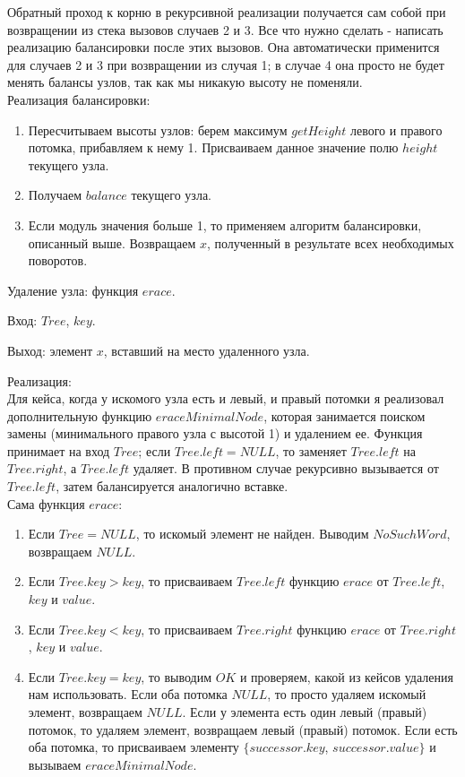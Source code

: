\documentclass[12pt]{article}
\begin{document}
	Обратный проход к корню в рекурсивной реализации получается сам собой при возвращении из стека вызовов случаев 2 и 3. Все что нужно сделать - написать реализацию балансировки после этих вызовов. Она автоматически применится для случаев 2 и 3 при возвращении из случая 1; в случае 4 она просто не будет менять балансы узлов, так как мы никакую высоту не поменяли. \\[1mm]
	
	Реализация балансировки: 
	
	\begin{enumerate}
		\item Пересчитываем высоты узлов: берем максимум $getHeight$ левого и правого потомка, прибавляем к нему 1. Присваиваем данное значение полю $height$ текущего узла.
		\item Получаем $balance$ текущего узла.
		\item Если модуль значения больше 1, то применяем алгоритм балансировки, описанный выше. Возвращаем $x$, полученный в результате всех необходимых поворотов.
	\end{enumerate} 

	Удаление узла: функция $erace$.
	
	Вход: $Tree$, $key$.
	
	Выход: элемент $x$, вставший на место удаленного узла.
	
	Реализация: \\[1mm]
	
	Для кейса, когда у искомого узла есть и левый, и правый потомки я реализовал дополнительную функцию $eraceMinimalNode$, которая занимается поиском замены (минимального правого узла с высотой 1) и удалением ее. Функция принимает на вход $Tree$; если $Tree.left = NULL$, то заменяет $Tree.left$ на $Tree.right$, а $Tree.left$ удаляет. В противном случае рекурсивно вызывается от $Tree.left$, затем балансируется аналогично вставке. \\[1mm]
	
	Сама функция $erace$:
	
	\begin{enumerate}
		\item Если $Tree = NULL$, то искомый элемент не найден. Выводим $NoSuchWord$, возвращаем $NULL$.
		\item Если $Tree.key > key$, то присваиваем $Tree.left$ функцию $erace$ от $Tree.left$, $key$ и $value$.
		\item Если $Tree.key < key$, то присваиваем $Tree.right$ функцию $erace$ от $Tree.right$, $key$ и $value$.
		\item Если $Tree.key = key$, то выводим $OK$ и проверяем, какой из кейсов удаления нам использовать. Если оба потомка $NULL$, то просто удаляем искомый элемент, возвращаем $NULL$. Если у элемента есть один левый (правый) потомок, то удаляем элемент, возвращаем левый (правый) потомок. Если есть оба потомка, то присваиваем элементу $\{successor.key$, $successor.value\}$ и вызываем $eraceMinimalNode$.
	\end{enumerate}
	
\end{document}
